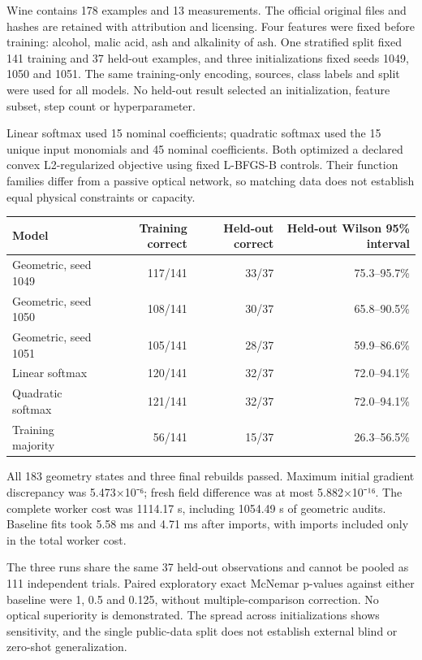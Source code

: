 \documentclass[
  10pt,
]{article}
\begin{document}
Wine contains 178 examples and 13 measurements. The official original
files and hashes are retained with attribution and licensing. Four
features were fixed before training: alcohol, malic acid, ash and
alkalinity of ash. One stratified split fixed 141 training and 37
held-out examples, and three initializations fixed seeds 1049, 1050 and
1051. The same training-only encoding, sources, class labels and split
were used for all models. No held-out result selected an initialization,
feature subset, step count or hyperparameter.

Linear softmax used 15 nominal coefficients; quadratic softmax used the
15 unique input monomials and 45 nominal coefficients. Both optimized a
declared convex L2-regularized objective using fixed L-BFGS-B controls.
Their function families differ from a passive optical network, so
matching data does not establish equal physical constraints or capacity.

\begin{longtable}[]{@{}lrrr@{}}
\toprule
Model & Training correct & Held-out correct & Held-out Wilson 95\%
interval \\
\midrule
\endhead
Geometric, seed 1049 & 117/141 & 33/37 & 75.3--95.7\% \\
Geometric, seed 1050 & 108/141 & 30/37 & 65.8--90.5\% \\
Geometric, seed 1051 & 105/141 & 28/37 & 59.9--86.6\% \\
Linear softmax & 120/141 & 32/37 & 72.0--94.1\% \\
Quadratic softmax & 121/141 & 32/37 & 72.0--94.1\% \\
Training majority & 56/141 & 15/37 & 26.3--56.5\% \\
\bottomrule
\end{longtable}

All 183 geometry states and three final rebuilds passed. Maximum initial
gradient discrepancy was 5.473×10⁻⁶; fresh field difference was at most
5.882×10⁻¹⁶. The complete worker cost was 1114.17 s, including 1054.49 s
of geometric audits. Baseline fits took 5.58 ms and 4.71 ms after
imports, with imports included only in the total worker cost.

The three runs share the same 37 held-out observations and cannot be
pooled as 111 independent trials. Paired exploratory exact McNemar
p-values against either baseline were 1, 0.5 and 0.125, without
multiple-comparison correction. No optical superiority is demonstrated.
The spread across initializations shows sensitivity, and the single
public-data split does not establish external blind or zero-shot
generalization.
\end{document}
